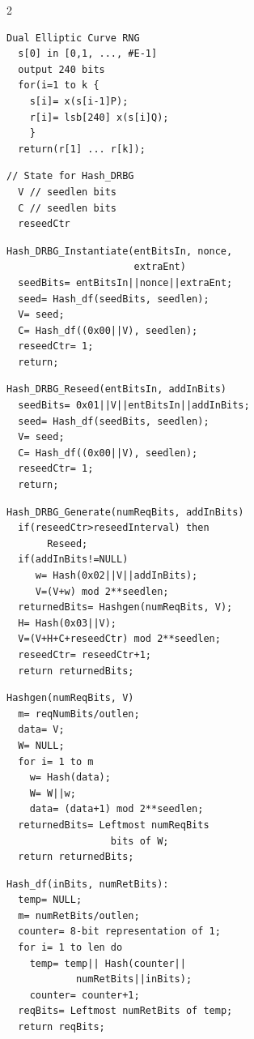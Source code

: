 \begin{multicols} {2} {

\begin{verbatim}
Dual Elliptic Curve RNG
  s[0] in [0,1, ..., #E-1]
  output 240 bits
  for(i=1 to k {
    s[i]= x(s[i-1]P);
    r[i]= lsb[240] x(s[i]Q);
    }
  return(r[1] ... r[k]);
\end{verbatim}


\begin{verbatim}
// State for Hash_DRBG
  V	// seedlen bits
  C	// seedlen bits
  reseedCtr 
\end{verbatim}

\begin{verbatim}
Hash_DRBG_Instantiate(entBitsIn, nonce, 
                      extraEnt)
  seedBits= entBitsIn||nonce||extraEnt;
  seed= Hash_df(seedBits, seedlen);
  V= seed;
  C= Hash_df((0x00||V), seedlen);
  reseedCtr= 1;
  return;
\end{verbatim}

\begin{verbatim}
Hash_DRBG_Reseed(entBitsIn, addInBits)
  seedBits= 0x01||V||entBitsIn||addInBits;
  seed= Hash_df(seedBits, seedlen);
  V= seed;
  C= Hash_df((0x00||V), seedlen);
  reseedCtr= 1;
  return;
\end{verbatim}

\begin{verbatim}
Hash_DRBG_Generate(numReqBits, addInBits)
  if(reseedCtr>reseedInterval) then 
       Reseed;
  if(addInBits!=NULL)
     w= Hash(0x02||V||addInBits);
     V=(V+w) mod 2**seedlen;
  returnedBits= Hashgen(numReqBits, V);
  H= Hash(0x03||V);
  V=(V+H+C+reseedCtr) mod 2**seedlen;
  reseedCtr= reseedCtr+1;
  return returnedBits;
\end{verbatim}

\begin{verbatim}
Hashgen(numReqBits, V)
  m= reqNumBits/outlen;
  data= V;
  W= NULL;
  for i= 1 to m
    w= Hash(data);
    W= W||w;
    data= (data+1) mod 2**seedlen;
  returnedBits= Leftmost numReqBits
                  bits of W;
  return returnedBits;
\end{verbatim}

\begin{verbatim}
Hash_df(inBits, numRetBits):
  temp= NULL;
  m= numRetBits/outlen;
  counter= 8-bit representation of 1;
  for i= 1 to len do
    temp= temp|| Hash(counter||
            numRetBits||inBits);
    counter= counter+1;
  reqBits= Leftmost numRetBits of temp;
  return reqBits;
\end{verbatim}



}
\end{multicols}
